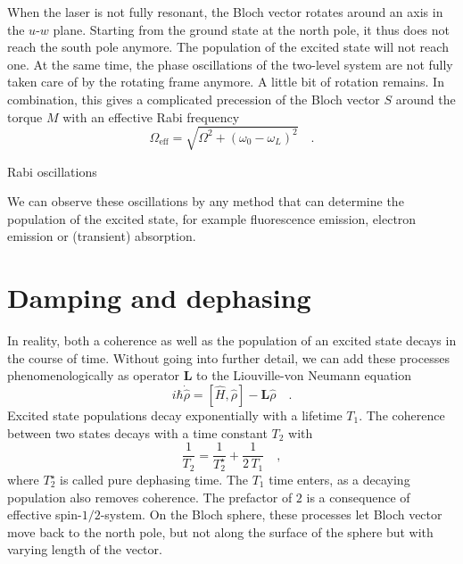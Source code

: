 When the laser is not fully resonant, the Bloch vector rotates around an axis in the $u$-$w$ plane. Starting from the ground state at the north pole, it thus does not reach the south pole anymore. The population of the excited state will  not reach one. At the same time, the phase oscillations of the two-level system are not fully taken care of by the rotating frame anymore. A little bit of rotation remains. In combination, this gives a complicated precession of the Bloch vector $S$ around the torque $M$ with an effective Rabi frequency 
\begin{equation}
 \Omega_\text{eff} = \sqrt{\Omega^2 + (\omega_0 - \omega_L)^2 } \quad .
\end{equation}

\begin{marginfigure} 
    \caption{Rabi oscillations}
    \label{fig:Rabi}
\end{marginfigure}

We can observe these oscillations by any method that can determine the population of the excited state, for example fluorescence emission, electron emission or (transient) absorption.




\section{Damping and dephasing}

In reality, both a coherence as well as the population of an excited state decays in the course of time. Without going into further detail, we can add these processes phenomenologically as operator $\boldsymbol{L}$ to the Liouville-von Neumann equation
\begin{equation}
    i\hbar \dot{\hat{\rho}} =
    [\hat{H},\hat{\rho}] - \boldsymbol{L}  \hat{\rho} \quad .
\end{equation}
Excited state populations decay exponentially with a lifetime $T_1$. The coherence between two states decays with a time constant $T_2$ with
\begin{equation}
    \frac{1}{T_2} = \frac{1}{T_2^\star} + \frac{1}{2 \, T_1} \quad ,
\end{equation}
where $T_2^\star$ is called pure dephasing time. The $T_1$ time enters, as a decaying population also removes coherence. The prefactor of $2$ is a consequence of effective spin-$1/2$-system. On the Bloch sphere, these processes let Bloch vector move back to the north pole, but not along the surface of the sphere but with varying length of the vector.



\printbibliography[segment=\therefsegment,heading=subbibliography]
